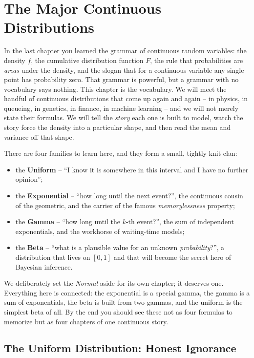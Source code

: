\chapter{The Major Continuous Distributions}

In the last chapter you learned the grammar of continuous random variables:
the density $f$, the cumulative distribution function $F$, the rule that
probabilities are \emph{areas} under the density, and the slogan that for a
continuous variable any single point has probability zero. That grammar is
powerful, but a grammar with no vocabulary says nothing. This chapter is the
vocabulary. We will meet the handful of continuous distributions that come up
again and again -- in physics, in queueing, in genetics, in finance, in
machine learning -- and we will not merely state their formulas. We will tell
the \emph{story} each one is built to model, watch the story force the density
into a particular shape, and then read the mean and variance off that shape.

There are four families to learn here, and they form a small, tightly knit
clan:

\begin{itemize}
  \item the \textbf{Uniform} -- ``I know it is somewhere in this interval and I
    have no further opinion'';
  \item the \textbf{Exponential} -- ``how long until the next event?'', the
    continuous cousin of the geometric, and the carrier of the famous
    \emph{memorylessness} property;
  \item the \textbf{Gamma} -- ``how long until the $k$-th event?'', the sum of
    independent exponentials, and the workhorse of waiting-time models;
  \item the \textbf{Beta} -- ``what is a plausible value for an unknown
    \emph{probability}?'', a distribution that lives on $[0,1]$ and that will
    become the secret hero of Bayesian inference.
\end{itemize}

We deliberately set the \emph{Normal} aside for its own chapter; it deserves
one. Everything here is connected: the exponential is a special gamma, the
gamma is a sum of exponentials, the beta is built from two gammas, and the
uniform is the simplest beta of all. By the end you should see these not as four
formulas to memorize but as four chapters of one continuous story.

\section{The Uniform Distribution: Honest Ignorance}
\label{ch11:uniform}

